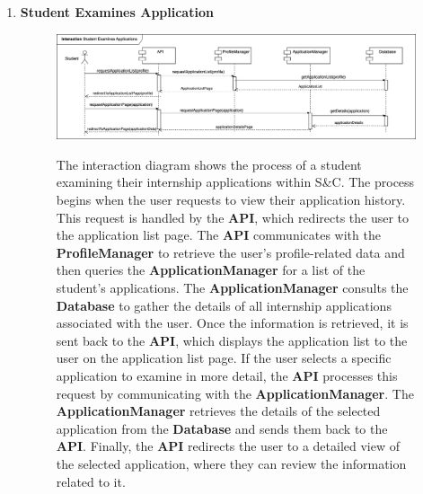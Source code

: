 \begin{enumerate}
    \newpage
    \item \textbf{Student Examines Application}
    \begin{figure}[h!]
            \centering  \includegraphics[width=1\textwidth]{DD/Images/Interactions/INT07_StudentExaminesApplications.drawio.png}
            \label{fig:ComponentViewDiagram}
            \caption*{The interaction diagram shows the process of a student examining their internship applications within S\&C. The process begins when the user requests to view their application history. This request is handled by the \textbf{API}, which redirects the user to the application list page. The \textbf{API} communicates with the \textbf{ProfileManager} to retrieve the user’s profile-related data and then queries the \textbf{ApplicationManager} for a list of the student’s applications.
            The \textbf{ApplicationManager} consults the \textbf{Database} to gather the details of all internship applications associated with the user. Once the information is retrieved, it is sent back to the \textbf{API}, which displays the application list to the user on the application list page.
            If the user selects a specific application to examine in more detail, the \textbf{API} processes this request by communicating with the \textbf{ApplicationManager}. The \textbf{ApplicationManager} retrieves the details of the selected application from the \textbf{Database} and sends them back to the \textbf{API}. Finally, the \textbf{API} redirects the user to a detailed view of the selected application, where they can review the information related to it.
            }
    \end{figure}


\end{enumerate}
